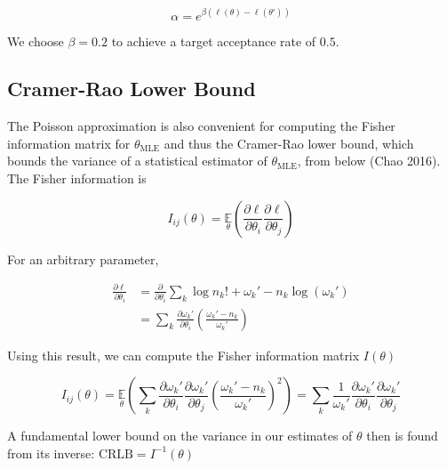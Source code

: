 \documentclass{article}
\begin{document}
\begin{equation*}
\alpha = e^{\beta(\ell(\theta)-\ell(\theta'))}
\end{equation*}

We choose $\beta=0.2$ to achieve a target acceptance rate of $0.5$.

\subsection{Cramer-Rao Lower Bound}

The Poisson approximation is also convenient for computing the Fisher information matrix for $\theta_{\mathrm{MLE}}$ and thus the Cramer-Rao lower bound, which bounds the variance of a statistical estimator of $\theta_{\mathrm{MLE}}$, from below (Chao 2016). The Fisher information is

\begin{equation}
I_{ij}(\theta) = \underset{\theta}{\mathbb{E}}\left(\frac{\partial \ell}{\partial\theta_{i}}\frac{\partial\ell}{\partial\theta_{j}}\right) 
\end{equation}

For an arbitrary parameter,

\begin{align*}
\frac{\partial \ell}{\partial \theta_{i}} &= \frac{\partial}{\partial \theta_{i}} \sum_{k}  \log n_{k}! + \omega_{k}' - n_{k}\log\left(\omega_{k}'\right)\\
&= \sum_{k} \frac{\partial \omega_{k}'}{\partial\theta_{i}} \left(\frac{\omega_{k}'-n_{k}}{\omega_{k}'}\right)
\end{align*}

Using this result, we can compute the Fisher information matrix $I(\theta)$

\begin{equation*}
I_{ij}(\theta) = \underset{\theta}{\mathbb{E}}\left(\sum_{k}\frac{\partial \omega_{k}'}{\partial\theta_{i}}\frac{\partial \omega_{k}'}{\partial\theta_{j}} \left(\frac{\omega_{k}'-n_{k}}{\omega_{k}'}\right)^{2}\right) = \sum_{k}\frac{1}{\omega_{k}'}\frac{\partial \omega_{k}'}{\partial\theta_{i}}\frac{\partial \omega_{k}'}{\partial\theta_{j}}
\end{equation*}

A fundamental lower bound on the variance in our estimates of $\theta$ then is found from its inverse: $\mathrm{CRLB} = I^{-1}(\theta)$
\end{document}

